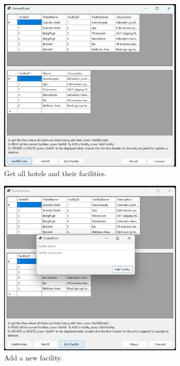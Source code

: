 \begin{figure}
    \centering
    \includegraphics[width=0.8\textwidth]{figures/app-screenshots/3getallhotels.png}
    \caption{Get all hotels and their facilities.}
    \label{fig:3getallhotels}
\end{figure}

\begin{figure}
    \centering
    \includegraphics[width=0.8\textwidth]{figures/app-screenshots/4createform.png}
    \caption{Add a new facility.}
    \label{fig:4createform}
\end{figure}

